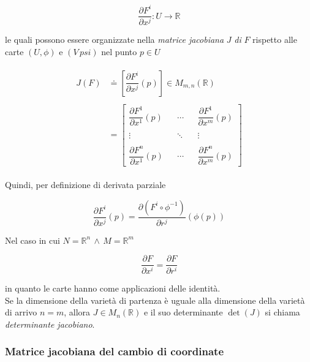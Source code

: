\begin{equation}
	\dfrac{\partial F^{i}}{\partial x^{j}} : U \to \mathbb{R}
\end{equation}

le quali possono essere organizzate nella \textit{matrice jacobiana} $ J $ \textit{di} $ F $ rispetto alle carte $ (U,\phi) $ e $ (V\,psi) $ nel punto $ p \in U $

\begin{align}
	\begin{split}
		J(F) &\doteq \left[ \dfrac{\partial F^{i}}{\partial x^{j}} (p) \right] \in M_{m,n}(\mathbb{R})\\\\
		&= \begin{bmatrix} \dfrac{\partial F^{1}}{\partial x^{1}} (p) & & \cdots & & \dfrac{\partial F^{1}}{\partial x^{m}} (p) \\\\ \vdots & & \ddots & & \vdots \\\\ \dfrac{\partial F^{n}}{\partial x^{1}} (p) & & \cdots & & \dfrac{\partial F^{n}}{\partial x^{m}} (p) \end{bmatrix}
	\end{split}
\end{align}

Quindi, per definizione di derivata parziale

\begin{equation}
	\dfrac{\partial F^{i}}{\partial x^{j}} (p) = \dfrac{\partial (F^{i} \circ \phi^{-1})}{\partial r^{j}} (\phi(p))
\end{equation}

Nel caso in cui $ N = \mathbb{R}^{n} \, \wedge \,  M = \mathbb{R}^{m} $

\begin{equation}
	\dfrac{\partial F}{\partial x^{i}} = \dfrac{\partial F}{\partial r^{i}}
\end{equation}

in quanto le carte hanno come applicazioni delle identità.\\
Se la dimensione della varietà di partenza è uguale alla dimensione della varietà di arrivo $ n=m $, allora $ J \in M_{n}(\mathbb{R}) $ e il suo determinante $ \det(J) $ si chiama \textit{determinante jacobiano}.

\subsubsection{Matrice jacobiana del cambio di coordinate}

